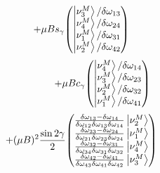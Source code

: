 \documentclass[10pt]{beamer}
\begin{document}
\begin{frame}
\begin{minipage}{0.45\textwidth}
\begin{equation*}
            + \mu B s_{\gamma} \mqty(
                    \ket{\nu^{M}_{3}}/\delta \omega_{13} \\
                    \ket{\nu^{M}_{4}}/\delta \omega_{24} \\
                    \ket{\nu^{M}_{1}}/\delta \omega_{31} \\
                    \ket{\nu^{M}_{2}}/\delta \omega_{42})
        \end{equation*}
            \begin{equation*}
            \hspace{1.5cm}+ \mu B c_{\gamma} \mqty(
            \ket{\nu^{M}_{4}}/\delta \omega_{14} \\
            \ket{\nu^{M}_{3}}/\delta \omega_{23} \\
            \ket{\nu^{M}_{2}}/\delta \omega_{32} \\
            \ket{\nu^{M}_{1}}/\delta \omega_{41})
        \end{equation*}
        \begin{equation*}
            + (\mu B)^{2} \frac{\sin 2\gamma}{2} \mqty(\frac{\delta \omega_{13} - 
            \delta \omega_{14}}{\delta \omega_{12} \delta \omega_{13} 
            \delta \omega_{14}} \ket{\nu^{M}_{2}} \\
            \frac{\delta \omega_{23} - \delta \omega_{24}}{\delta \omega_{21} 
            \delta \omega_{23} \delta \omega_{24}} \ket{\nu^{M}_{1}} \\
            \frac{\delta \omega_{32} - \delta \omega_{31}}{\delta \omega_{34} 
            \delta \omega_{31} \delta \omega_{32}} \ket{\nu^{M}_{4}} \\
            \frac{\delta \omega_{42} - \delta \omega_{41}}{\delta \omega_{43} 
            \delta \omega_{41} \delta \omega_{42}} \ket{\nu^{M}_{3}})
        \end{equation*}
        \normalsize
    \end{minipage}
\end{frame}
\end{document}
